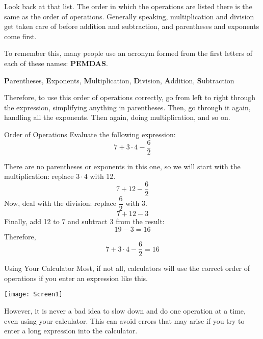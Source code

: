 Look back at that list.  The order in which the operations are listed there is the same as the order of operations.  Generally speaking, multiplication and division get taken care of before addition and subtraction, and parentheses and exponents come first.

To remember this, many people use an acronym formed from the first letters of each of these names: \textbf{PEMDAS}.
\begin{center}
{\huge\bfseries P}arentheses, {\huge\bfseries E}xponents, {\huge\bfseries M}ultiplication, {\huge\bfseries D}ivision, {\huge\bfseries A}ddition, {\huge\bfseries S}ubtraction
\end{center}

Therefore, to use this order of operations correctly, go from left to right through the expression, simplifying anything in parentheses.  Then, go through it again, handling all the exponents.  Then again, doing multiplication, and so on.
\pagebreak

\begin{example}{Order of Operations}
Evaluate the following expression:
\[7+3 \cdot 4 - \dfrac{6}{2}\]

\sol
There are no parentheses or exponents in this one, so we will start with the multiplication: replace $3 \cdot 4$ with 12.
\[7+12-\dfrac{6}{2}\]
Now, deal with the division: replace $\dfrac{6}{2}$ with 3.
\[7+12-3\]
Finally, add 12 to 7 and subtract 3 from the result:
\[19-3 = 16\]
Therefore,
\[7+3 \cdot 4-\dfrac{6}{2} = \boxed{16}\]
\end{example}

\begin{proc}{Using Your Calculator}
Most, if not all, calculators will use the correct order of operations if you enter an expression like this.
\begin{center}
\texttt{[image: Screen1]}
\end{center}
However, it is never a bad idea to slow down and do one operation at a time, even using your calculator.  This can avoid errors that may arise if you try to enter a long expression into the calculator.
\end{proc}

